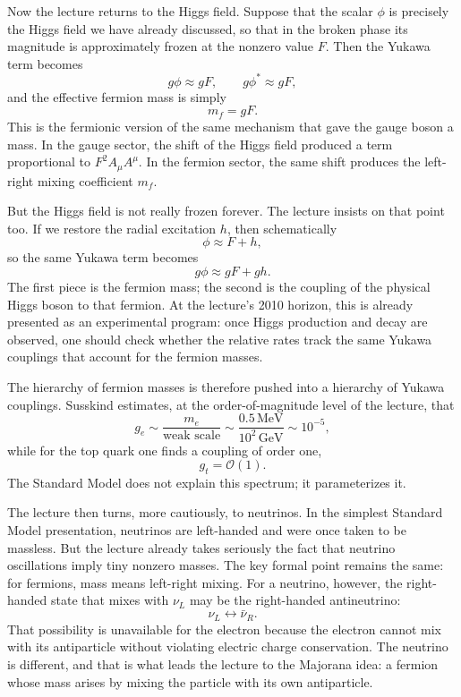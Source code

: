 Now the lecture returns to the Higgs field. Suppose that the scalar \(\phi\) is precisely the Higgs field we have already discussed, so that in the broken phase its magnitude is approximately frozen at the nonzero value \(F\). Then the Yukawa term becomes
\begin{equation}
g\phi \approx gF,
\qquad
g\phi^* \approx gF,
\end{equation}
and the effective fermion mass is simply
\begin{equation}
m_f=gF.
\end{equation}
This is the fermionic version of the same mechanism that gave the gauge boson a mass. In the gauge sector, the shift of the Higgs field produced a term proportional to \(F^2 A_\mu A^\mu\). In the fermion sector, the same shift produces the left-right mixing coefficient \(m_f\).

But the Higgs field is not really frozen forever. The lecture insists on that point too. If we restore the radial excitation \(h\), then schematically
\begin{equation}
\phi \approx F+h,
\end{equation}
so the same Yukawa term becomes
\begin{equation}
g\phi \approx gF + gh.
\end{equation}
The first piece is the fermion mass; the second is the coupling of the physical Higgs boson to that fermion. At the lecture's 2010 horizon, this is already presented as an experimental program: once Higgs production and decay are observed, one should check whether the relative rates track the same Yukawa couplings that account for the fermion masses.

The hierarchy of fermion masses is therefore pushed into a hierarchy of Yukawa couplings. Susskind estimates, at the order-of-magnitude level of the lecture, that
\begin{equation}
g_e \sim \frac{m_e}{\text{weak scale}} \sim \frac{0.5\,\mathrm{MeV}}{10^2\,\mathrm{GeV}} \sim 10^{-5},
\end{equation}
while for the top quark one finds a coupling of order one,
\begin{equation}
g_t=\mathcal{O}(1).
\end{equation}
The Standard Model does not explain this spectrum; it parameterizes it.

The lecture then turns, more cautiously, to neutrinos. In the simplest Standard Model presentation, neutrinos are left-handed and were once taken to be massless. But the lecture already takes seriously the fact that neutrino oscillations imply tiny nonzero masses. The key formal point remains the same: for fermions, mass means left-right mixing. For a neutrino, however, the right-handed state that mixes with \(\nu_L\) may be the right-handed antineutrino:
\begin{equation}
\nu_L \longleftrightarrow \bar{\nu}_R.
\end{equation}
That possibility is unavailable for the electron because the electron cannot mix with its antiparticle without violating electric charge conservation. The neutrino is different, and that is what leads the lecture to the Majorana idea: a fermion whose mass arises by mixing the particle with its own antiparticle.

